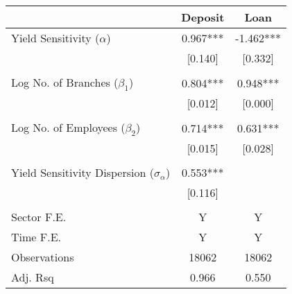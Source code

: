 \def\sym#1{\ifmmode^{#1}\else\(^{#1}\)\fi}\begin{tabular*}{\hsize}{@{\hskip\tabcolsep\extracolsep\fill}l*{2}{c}}\hline \hline &Deposit &Loan  \\ [1ex] \hline  Yield Sensitivity ($\alpha$)&0.967***&-1.462***\\
&[0.140]&[0.332]\\
\\
Log No. of Branches ($\beta_1$)&0.804***&0.948***\\
&[0.012]&[0.000]\\
\\
Log No. of Employees ($\beta_2$)&0.714***&0.631***\\
&[0.015]&[0.028]\\
\\
Yield Sensitivity Dispersion ($\sigma_{\alpha}$)&0.553***&\\
&[0.116]&\\
\\
\hline Sector F.E.&Y&Y \\ 
Time F.E.&Y&Y \\ 
Observations& 18062 &  18062\\
Adj. Rsq& 0.966 & 0.550\\
\hline \hline \end{tabular*}
